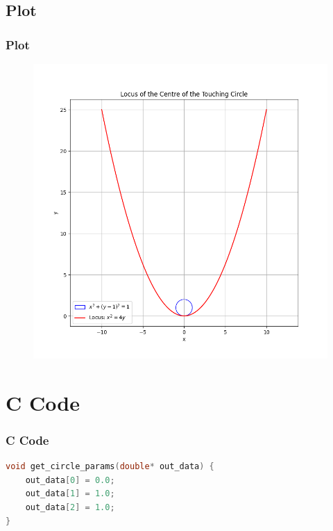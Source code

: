 \documentclass{beamer}
\theoremstyle{remark}
\numberwithin{equation}{section}
\begin{document}
\subsection{Plot}
\begin{frame}[fragile]
\frametitle{Plot}

\begin{figure}[h!]
   \centering
   \includegraphics[width=0.7\columnwidth]{figs/fig1.png}
	\caption{}
   \label{}
\end{figure}
\end{frame}

\section{C Code}
\begin{frame}[fragile]
\frametitle{C Code}
\begin{lstlisting}[language=C]
 void get_circle_params(double* out_data) {
    out_data[0] = 0.0; 
    out_data[1] = 1.0; 
    out_data[2] = 1.0; 
}
    \end{lstlisting}
\end{frame}
\end{document}
